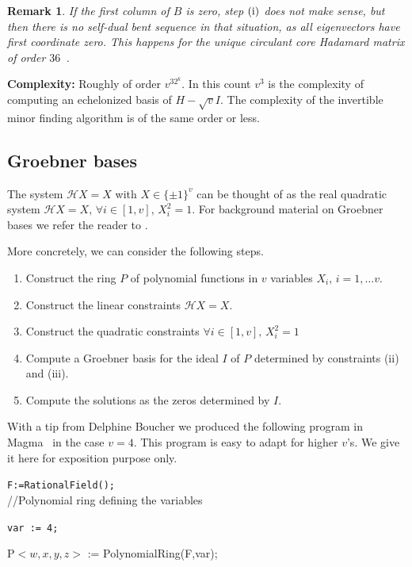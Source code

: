 \documentclass[12pt]{article}
\newtheorem{rem}{Remark}
\begin{document}
  \begin{rem}
  {\em 
 If the first column of $B$ is zero, step $\rm(i)$ does not make sense, but then there is no self-dual bent sequence in that situation, as all eigenvectors have first coordinate zero. This happens for the unique circulant core Hadamard matrix of
order $36$~\cite{KKS:2006}.

}
\end{rem}

{\bf Complexity:} Roughly of order $v^32^k$. In this count $v^3$ is the complexity of computing an echelonized basis of $H-\sqrt{v}I$. The complexity of the invertible minor finding
algorithm is of the same order or less.
\subsection{Groebner bases}

The system $\mathcal{H}X=X$ with $X \in \{\pm 1\}^v$ can be thought of as the real quadratic system $\mathcal{H}X=X,\, \forall i \in [1,v],\, X_i^2=1$.
For background material on Groebner bases we refer the reader to \cite{AL}.

More concretely, we can consider the following steps.

\begin{enumerate}
 \item [\rm(i)] Construct the ring $P$ of polynomial functions in $v$ variables $X_i, \, i=1,\dots v.$
 \item [\rm(ii)] Construct the linear constraints $\mathcal{H}X=X.$
 \item [\rm(iii)] Construct the quadratic constraints $\forall i \in [1,v],\, X_i^2=1$
 \item [\rm(iv)] Compute a Groebner basis for the ideal $I$ of  $P$ determined by constraints (ii) and (iii).
 \item [\rm(v)] Compute the solutions as the zeros determined by $I.$
\end{enumerate}

With a tip from Delphine Boucher we produced the following program in Magma~\cite{Ma} in the case $v=4$. This program is easy to adapt for higher $v$'s.
We give it here for exposition purpose only.


{\tt F:=RationalField();} \\
//Polynomial ring defining the variables

{\tt var := 4;

 P$<w,x,y,z>$ := PolynomialRing(F,var);} \\ \ \
\end{document}
